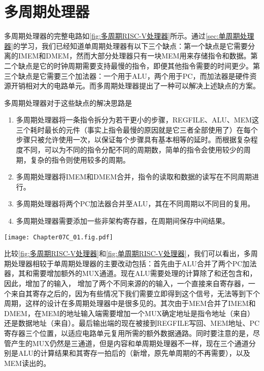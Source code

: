 \section{多周期处理器}

多周期处理器的完整电路如\cref{fig:多周期RISC-V处理器}所示。通过\cref{sec:单周期处理器}的学习，我们已经知道单周期处理器有以下三个缺点：第一个缺点是它需要分离的IMEM和DMEM，然而大部分处理器只有一块MEM用来存储指令和数据。第二个缺点是它的时钟周期需要支持最慢的指令，即便其他指令需要的时间更少。第三个缺点是它需要三个加法器：一个用于ALU，两个用于PC，而加法器是硬件资源开销相对大的电路单元。而多周期处理器提出了一种可以解决上述缺点的方案。

多周期处理器对于这些缺点的解决思路是
\begin{enumerate}
    \item 多周期处理器将一条指令拆分为若干更小的步骤，REGFILE、ALU、MEM这三个耗时最长的元件（事实上指令最慢的原因就是它三者全部使用了）在每个步骤只被允许使用一次，以保证每个步骤具有基本相等的延时。而根据复杂程度不同，可以为不同的指令分配不同的周期数，简单的指令会使用较少的周期，复杂的指令则使用较多的周期。
    \item 多周期处理器将IMEM和DMEM合并，指令的读取和数据的读写在不同周期进行。
    \item 多周期处理器将两个PC加法器合并至ALU，其在不同周期以不同目的复用。
    \item 多周期处理器需要添加一些非架构寄存器，在周期间保存中间结果。
\end{enumerate}

\begin{Figure}
    \texttt{[image: Chapter07C\_01.fig.pdf]}
\end{Figure}

比较\cref{fig:多周期RISC-V处理器}和\cref{fig:单周期RISC-V处理器}，我们可以看出，多周期处理器相较于单周期处理器的主要改动包括：首先由于ALU合并了两个PC加法器，其和需要增加额外的MUX通道。现在ALU需要处理的计算除了和还包含和，因此，增加了的输入， 增加了两个不同来源的的输入，一个直接来自寄存器，一个来自其寄存之后的，因为有些情况下我们需要立即得到这个信号，无法等到下个周期，这样的设计在多周期处理器中是很多见的。其次由于MEM合并了IMEM和DMEM，在MEM的地址输入端需要增加一个MUX确定地址是指令地址（来自）还是数据地址（来自）。最后输出端的现在被接到REGFILE写回、MEM地址、PC寄存器三个位置，以适应电路单元复用所需的额外数据通路。同时要注意的是，尽管产生的MUX仍然是三通道，但是内容和单周期处理器不一样，现在三个通道分别是ALU的计算结果和其寄存一拍后的（新增，原先单周期的不再需要），以及MEM读出的。


